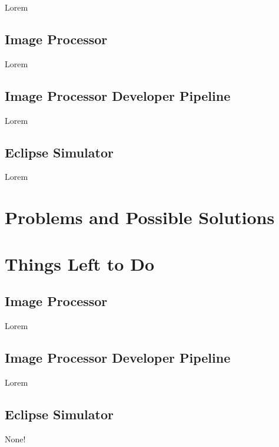 \documentclass[10pt, onecolumn, draftclsnofoot, letterpaper, compsoc]{IEEEtran}
\begin{document}
Lorem \\

\subsection{Image Processor}

Lorem \\

\subsection{Image Processor Developer Pipeline}

Lorem \\

\subsection{Eclipse Simulator}

Lorem \\


\section{Problems and Possible Solutions}


\section{Things Left to Do}

\subsection{Image Processor}

Lorem \\

\subsection{Image Processor Developer Pipeline}

Lorem \\

\subsection{Eclipse Simulator}

None! \\
\end{document}
